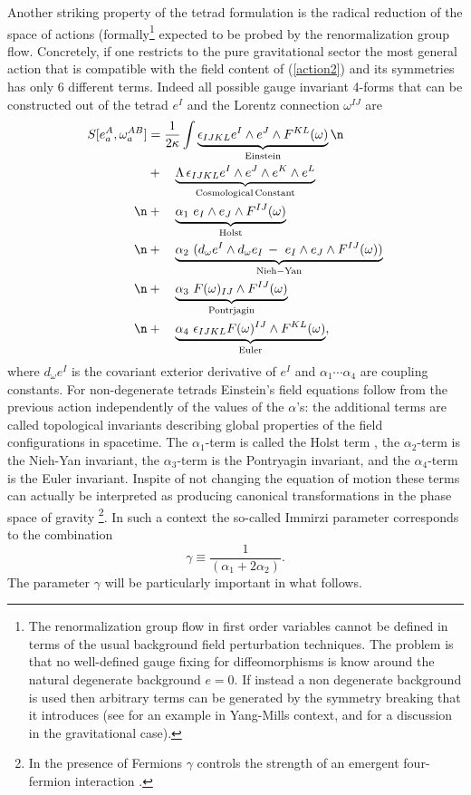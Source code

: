 \documentclass[aps, nofootinbib,superscriptaddress,12pt]{revtex4-2}
\def\be{\begin{equation}}
\def\ee{\end{equation}}
\begin{document}
Another striking property of the tetrad formulation is the radical reduction of the space of actions (formally\footnote{The renormalization group flow in first order variables cannot be defined in terms of the usual background field perturbation techniques. The problem is that no well-defined gauge fixing for diffeomorphisms is know around the natural degenerate  background $e=0$. If instead a non degenerate background is used then arbitrary terms can be generated by the symmetry breaking that it introduces (see \cite{Rovelli:2005qb} for an example in Yang-Mills context, and \cite{Daum:2010qt} for a discussion in the gravitational case).} expected to be probed 
by the renormalization group flow. Concretely, if one restricts to the pure gravitational sector the most general action that is compatible with the field content of (\ref{action2}) and its symmetries has only 6 different terms. Indeed all possible gauge invariant 4-forms that can be constructed out of the tetrad $e^I$ and the Lorentz connection $\omega^{IJ}$ are  
\begin{align}
\label{actiong}
S[e_a^A,\omega_a^{AB}]&=\frac{1}{2 \kappa} \int \underbrace{ \epsilon_{IJKL} e^I\wedge e^J\wedge F^{KL}(\omega)}_{\rm Einstein}\n\\
&+ \quad \underbrace{{\Lambda} \, \epsilon_{IJKL} e^I\wedge e^J\wedge e^K\wedge e^L }_{\rm Cosmological\, Constant}\\\n
&+ \quad\underbrace{\alpha_1 \ e_I\wedge e_J\wedge F^{IJ}(\omega)}_{\rm Holst} \\\n  
&+ \quad \underbrace{\alpha_2 \ (d_{\omega} e^I \wedge d_{\omega} e_I \,- \ e_I\wedge e_J\wedge F^{IJ}(\omega))}_{\rm Nieh-Yan}  \\\n
&+ \quad \underbrace{\alpha_3 \ F(\omega)_{IJ} \wedge F^{IJ}(\omega)}_{\rm Pontrjagin}  \\\n
&+ \quad \underbrace{\alpha_4 \ \epsilon_{IJKL} F(\omega)^ {IJ} \wedge F^{KL}(\omega)}_{\rm Euler}, 
\end{align}
where $d_\omega e^I$ is the covariant exterior derivative of $e^I$ and $\alpha_1\cdots \alpha_4$ are coupling constants.  For non-degenerate
tetrads Einstein's field equations follow from the previous action independently of the values of the $\alpha$'s:
the additional terms are called topological invariants describing global properties of the field configurations in spacetime. The $\alpha_1$-term is called the Holst term \cite{Holst:1995pc}, the $\alpha_2$-term is the Nieh-Yan invariant, the $\alpha_3$-term is the Pontryagin invariant, and the $\alpha_4$-term is the Euler invariant.  Inspite of not changing the equation of motion these terms can actually be interpreted as producing  canonical transformations in the phase space of gravity \footnote{In the presence of Fermions $\gamma$ controls the strength of an emergent four-fermion interaction \cite{Perez:2005pm, Freidel:2005sn, Mercuri:2006um}.}. In such a context the so-called Immirzi parameter \cite{Immirzi:1996di} corresponds to the combination \cite{Rezende:2009sv}
\be
\gamma\equiv \frac{1}{(\alpha_1+2\alpha_2)}.
\ee
The parameter $\gamma$  will be particularly important in what follows.
\end{document}
